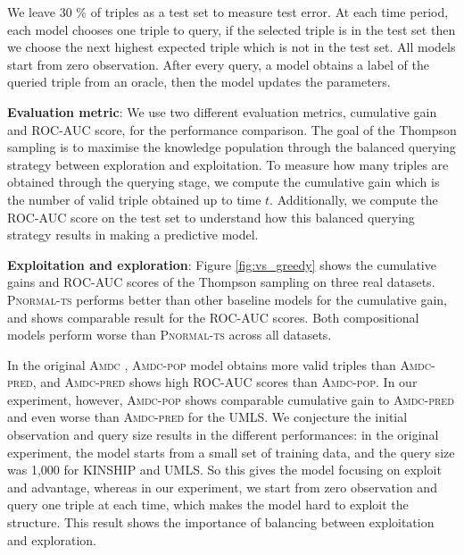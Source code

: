 We leave 30 \% of triples as a test set to measure test error.
At each time period, each model chooses one triple to query,
if the selected triple is in the test set then we choose the next highest expected triple which is not in the test set.
All models start from zero observation.
After every query, a model obtains a label of the queried triple from an oracle,
then the model updates the parameters.

\textbf{Evaluation metric}: We use two different evaluation metrics, cumulative gain and ROC-AUC score,
for the performance comparison. The goal of the Thompson sampling is to maximise the knowledge
population through the balanced querying strategy between exploration and exploitation.
To measure how many triples are obtained through the querying stage, we compute the cumulative
gain which is the number of valid triple obtained up to time $t$. Additionally, we compute the ROC-AUC score on
the test set to understand how this balanced querying strategy results in making a predictive model.

\textbf{Exploitation and exploration}:
Figure \ref{fig:vs_greedy} shows
the cumulative gains and ROC-AUC scores of the Thompson sampling on three real datasets.
\textsc{Pnormal-ts} performs better than other baseline models for the cumulative gain, and shows comparable result for the ROC-AUC scores. Both compositional models perform worse than \textsc{Pnormal-ts} across all datasets.

In the original \textsc{Amdc} \cite{kajino2015active}, \textsc{Amdc-pop} model obtains more
valid triples than \textsc{Amdc-pred}, and \textsc{Amdc-pred} shows high ROC-AUC scores than \textsc{Amdc-pop}.
In our experiment, however, \textsc{Amdc-pop} shows comparable cumulative gain to \textsc{Amdc-pred}
and even worse than \textsc{Amdc-pred} for the UMLS. We conjecture the initial observation and query size results in the different performances: in the original experiment, the model starts
from a small set of training data, and the query size was 1,000 for KINSHIP and UMLS. So this gives the model focusing on exploit and advantage,
whereas in our experiment, we start from zero
observation and query one triple at each time, which makes the model hard to exploit the structure. This result shows
the importance of balancing between exploitation and exploration.


